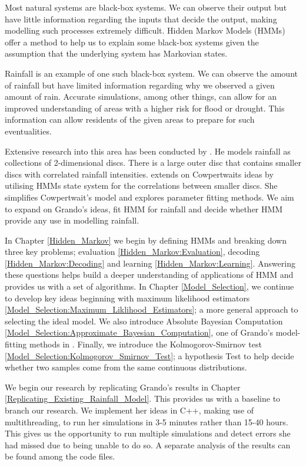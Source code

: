 Most natural systems are black-box systems. We can observe their output but have little information regarding the inputs that decide the output,  making modelling such processes extremely difficult.  Hidden Markov Models (HMMs) offer a method to help us to explain some black-box systems given the assumption that the underlying system has Markovian states.

Rainfall is an example of one such black-box system. We can observe the amount of rainfall but have limited information regarding why we observed a given amount of rain.  Accurate simulations, among other things,  can allow for an improved understanding of areas with a higher risk for flood or drought. This information can allow residents of the given areas to prepare for such eventualities.

Extensive research into this area has been conducted by \cite{Cowpertwait1994}. He models rainfall as collections of 2-dimensional discs. There is a large outer disc that contains smaller discs with correlated rainfall intensities. \cite{Grando2019} extends on Cowpertwaits ideas by utilising HMMs state system for the correlations between smaller discs. She simplifies Cowpertwait's model and explores parameter fitting methods. We aim to expand on Grando's ideas, fit HMM for rainfall and decide whether HMM provide any use in modelling rainfall.

In Chapter \ref{Hidden_Markov} we begin by defining HMMs and breaking down three key problems; evaluation \ref{Hidden_Markov:Evaluation}, decoding \ref{Hidden_Markov:Decoding} and learning \ref{Hidden_Markov:Learning}. Answering these questions helps build a deeper understanding of applications of HMM and provides us with a set of algorithms. In Chapter \ref{Model_Selection}, we continue to develop key ideas beginning with maximum likelihood estimators \ref{Model_Selection:Maximum_Liklihood_Estimators}; a more general approach to selecting the ideal model.  We also introduce Absolute Bayesian Computation \ref{Model_Selection:Approximate_Bayesian_Computation}, one of Grando's model-fitting methods in \cite{Grando2019}. Finally, we introduce the Kolmogorov-Smirnov test \ref{Model_Selection:Kolmogorov_Smirnov_Test}; a hypothesis Test to help decide whether two samples come from the same continuous distributions.

We begin our research by replicating Grando's results in Chapter \ref{Replicating_Existing_Rainfall_Model}. This provides us with a baseline to branch our research. We implement her ideas in C++, making use of multithreading, to run her simulations in 3-5 minutes rather than 15-40 hours. This gives us the opportunity to run multiple simulations and detect errors she had missed due to being unable to do so. A separate analysis of the results can be found among the code files. 

